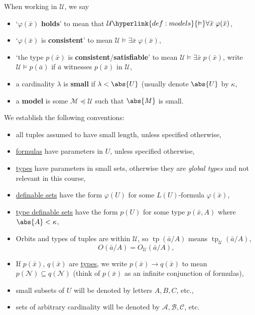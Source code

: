 \documentclass{article}
\let\models\vDash
\DeclareMathOperator{\tp}{tp}
\newcommand{\named}[1]{\textbf{#1}\index{#1}}
\begin{document}
\begin{ndef}\label{def:7.1}
  When working in $\mathcal{U}$, we say
  \begin{itemize}
    \item `$\varphi(\bar{x})$ \textbf{holds}' to mean that $\mathcal{U}\hyperlink{def:models}{\models}\forall \bar{x} \;\varphi(\bar{x})$,
    \item `$\varphi(\bar{x})$ is \named{consistent}' to mean $\mathcal{U}\models\exists\bar{x}\;\varphi(\bar{x})$,
    \item `the type $p(\bar{x})$ is \textbf{consistent}/\textbf{satisfiable}' to mean $\mathcal{U}\models\exists\bar{x}\;p(\bar{x})$, write $\mathcal{U} \models p(\bar a)$ if $\bar a$ witnesses $p(\bar x)$ in $\mathcal{U}$,
    \item a cardinality $\lambda$ is \hypertarget{def:small}{\named{small}} if $\lambda< \abs{U}$ (usually denote $\abs{U}$ by $\kappa$,
    \item a \textbf{model} is some $\mathcal{M}\preccurlyeq\mathcal{U}$ such that $\abs{M}$ is small.
  \end{itemize}
  We establish the following conventions:
  \begin{itemize}
    \item all tuples assumed to have small length, unless specified otherwise,
    \item \hyperlink{def:form}{formulas} have parameters in $U$, unless specified otherwise,
    \item \hyperlink{def:type}{types} have parameters in small sets, otherwise they are \emph{global types} and not relevant in this course,
    \item \hyperlink{def:setdef}{definable sets} have the form $\varphi(U)$ for some $L(U)$-formula $\varphi(\bar{x})$,
    \item \hyperlink{def:setdef}{type definable sets} have the form $p(U)$ for some type $ p(\bar{x},A)$ where $\abs{A} < \kappa$,
    \item Orbits and types of tuples are within $\mathcal{U}$, so $\tp(\bar{a}/A)$ means $\tp_{\mathcal{U}}(\bar{a}/A)$,
      \begin{equation*} O(\bar{a}/A)=O_{\mathcal{U}}(\bar{a}/A),
      \end{equation*}
    \item If $p(\bar{x})$, $q(\bar{x})$ are \hyperlink{def:type}{types}, we write $p(\bar{x})\to q(\bar{x})$ to mean $p(\mathcal{N})\subseteq q(\mathcal{N})$ (think of $p(\bar{x})$ as an infinite conjunction of formulas),
    \item small subsets of $U$ will be denoted by letters $A, B, C$, etc.,
    \item sets of arbitrary cardinality will be denoted by $\mathcal{A}, \mathcal{B}, \mathcal{C}$, etc.
  \end{itemize}
\end{ndef}
\end{document}
